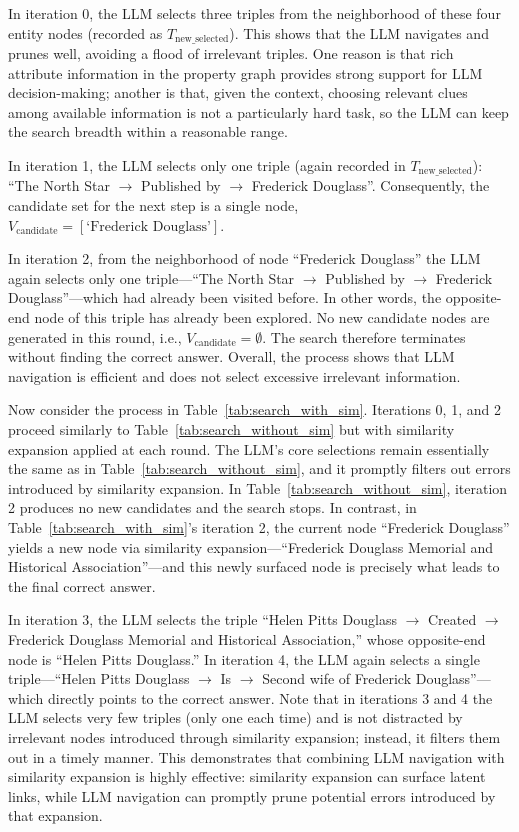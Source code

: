 \documentclass{article}
\theoremstyle{plain}
\theoremstyle{definition}
\theoremstyle{remark}
\begin{document}
In iteration 0, the LLM selects three triples from the neighborhood of these four entity nodes (recorded as $T_{\text{new\_selected}}$). This shows that the LLM navigates and prunes well, avoiding a flood of irrelevant triples. One reason is that rich attribute information in the property graph provides strong support for LLM decision-making; another is that, given the context, choosing relevant clues among available information is not a particularly hard task, so the LLM can keep the search breadth within a reasonable range.

In iteration 1, the LLM selects only one triple (again recorded in $T_{\text{new\_selected}}$): “The North Star $\rightarrow$ Published by $\rightarrow$ Frederick Douglass”. Consequently, the candidate set for the next step is a single node, $V_{\text{candidate}} = [\text{‘Frederick Douglass’}]$.

In iteration 2, from the neighborhood of node “Frederick Douglass” the LLM again selects only one triple—“The North Star $\rightarrow$ Published by $\rightarrow$ Frederick Douglass”—which had already been visited before. In other words, the opposite-end node of this triple has already been explored. No new candidate nodes are generated in this round, i.e., $V_{\text{candidate}} = \emptyset$. The search therefore terminates without finding the correct answer. Overall, the process shows that LLM navigation is efficient and does not select excessive irrelevant information.

Now consider the process in Table~\ref{tab:search_with_sim}. Iterations 0, 1, and 2 proceed similarly to Table~\ref{tab:search_without_sim} but with similarity expansion applied at each round. The LLM’s core selections remain essentially the same as in Table~\ref{tab:search_without_sim}, and it promptly filters out errors introduced by similarity expansion. In Table~\ref{tab:search_without_sim}, iteration 2 produces no new candidates and the search stops. In contrast, in Table~\ref{tab:search_with_sim}’s iteration 2, the current node “Frederick Douglass” yields a new node via similarity expansion—“Frederick Douglass Memorial and Historical Association”—and this newly surfaced node is precisely what leads to the final correct answer.

In iteration 3, the LLM selects the triple “Helen Pitts Douglass $\rightarrow$ Created $\rightarrow$ Frederick Douglass Memorial and Historical Association,” whose opposite-end node is “Helen Pitts Douglass.” In iteration 4, the LLM again selects a single triple—“Helen Pitts Douglass $\rightarrow$ Is $\rightarrow$ Second wife of Frederick Douglass”—which directly points to the correct answer. Note that in iterations 3 and 4 the LLM selects very few triples (only one each time) and is not distracted by irrelevant nodes introduced through similarity expansion; instead, it filters them out in a timely manner. This demonstrates that combining LLM navigation with similarity expansion is highly effective: similarity expansion can surface latent links, while LLM navigation can promptly prune potential errors introduced by that expansion.
\end{document}
